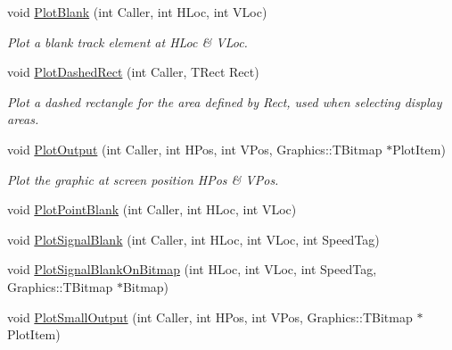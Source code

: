 \begin{DoxyCompactItemize}
\item 
\mbox{\label{class_t_display_ad601661fd4cd79a47b4c80ae77f901a9}} 
void \mbox{\hyperlink{class_t_display_ad601661fd4cd79a47b4c80ae77f901a9}{Plot\+Blank}} (int Caller, int H\+Loc, int V\+Loc)
\begin{DoxyCompactList}\small\item\em Plot a blank track element at H\+Loc \& V\+Loc. \end{DoxyCompactList}\item 
\mbox{\label{class_t_display_a09a60665a7a8c7b5d5c705a08086feec}} 
void \mbox{\hyperlink{class_t_display_a09a60665a7a8c7b5d5c705a08086feec}{Plot\+Dashed\+Rect}} (int Caller, T\+Rect Rect)
\begin{DoxyCompactList}\small\item\em Plot a dashed rectangle for the area defined by Rect, used when selecting display areas. \end{DoxyCompactList}\item 
\mbox{\label{class_t_display_a9ab49e52c7eb92b32ae2c34547183439}} 
void \mbox{\hyperlink{class_t_display_a9ab49e52c7eb92b32ae2c34547183439}{Plot\+Output}} (int Caller, int H\+Pos, int V\+Pos, Graphics\+::\+T\+Bitmap $\ast$Plot\+Item)
\begin{DoxyCompactList}\small\item\em Plot the graphic at screen position H\+Pos \& V\+Pos. \end{DoxyCompactList}\item 
void \mbox{\hyperlink{class_t_display_aab35e517eba56f1c95f500958ce431ae}{Plot\+Point\+Blank}} (int Caller, int H\+Loc, int V\+Loc)
\item 
void \mbox{\hyperlink{class_t_display_a69c85bcbafea6cba5f06a93ffae7d3b2}{Plot\+Signal\+Blank}} (int Caller, int H\+Loc, int V\+Loc, int Speed\+Tag)
\item 
void \mbox{\hyperlink{class_t_display_ab6c0da6543f57f83107fd0af371fec3e}{Plot\+Signal\+Blank\+On\+Bitmap}} (int H\+Loc, int V\+Loc, int Speed\+Tag, Graphics\+::\+T\+Bitmap $\ast$Bitmap)
\item 
\mbox{\label{class_t_display_a95aaa80515f0abb7715920b326b318dd}} 
void \mbox{\hyperlink{class_t_display_a95aaa80515f0abb7715920b326b318dd}{Plot\+Small\+Output}} (int Caller, int H\+Pos, int V\+Pos, Graphics\+::\+T\+Bitmap $\ast$Plot\+Item)

\end{DoxyCompactItemize}
